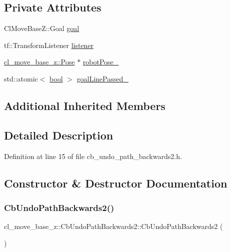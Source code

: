 \subsection*{Private Attributes}
\begin{DoxyCompactItemize}
\item 
Cl\+Move\+Base\+Z\+::\+Goal \hyperlink{classcl__move__base__z_1_1CbUndoPathBackwards2_a1b5d0fce772f7484b35abada92cf2b91}{goal}
\item 
tf\+::\+Transform\+Listener \hyperlink{classcl__move__base__z_1_1CbUndoPathBackwards2_a4531d3f52b12a4cce20ac1545ca2cb61}{listener}
\item 
\hyperlink{classcl__move__base__z_1_1Pose}{cl\+\_\+move\+\_\+base\+\_\+z\+::\+Pose} $\ast$ \hyperlink{classcl__move__base__z_1_1CbUndoPathBackwards2_a2d398dac07efaca840fbcea31957cf7a}{robot\+Pose\+\_\+}
\item 
std\+::atomic$<$ \hyperlink{classbool}{bool} $>$ \hyperlink{classcl__move__base__z_1_1CbUndoPathBackwards2_a1c037317330c74b60660548f09a01749}{goal\+Line\+Passed\+\_\+}
\end{DoxyCompactItemize}
\subsection*{Additional Inherited Members}


\subsection{Detailed Description}


Definition at line 15 of file cb\+\_\+undo\+\_\+path\+\_\+backwards2.\+h.



\subsection{Constructor \& Destructor Documentation}
\mbox{\label{classcl__move__base__z_1_1CbUndoPathBackwards2_a0f202bf7a4b1cc1db426a0c2ad1434f6}} 
\subsubsection{\texorpdfstring{Cb\+Undo\+Path\+Backwards2()}{CbUndoPathBackwards2()}}
{\footnotesize\ttfamily cl\+\_\+move\+\_\+base\+\_\+z\+::\+Cb\+Undo\+Path\+Backwards2\+::\+Cb\+Undo\+Path\+Backwards2 (\begin{DoxyParamCaption}{ }\end{DoxyParamCaption})}



